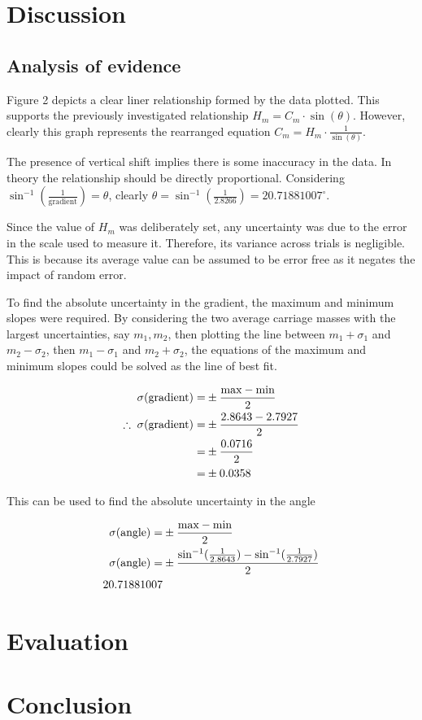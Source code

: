 \documentclass[11pt,a4paper]{article}
\begin{document}
\section{Discussion}
\subsection{Analysis of evidence}
Figure 2 depicts a clear liner relationship formed by the data plotted. This supports the previously investigated relationship  $H_m=C_m\cdot{\sin(\theta)}$. However, clearly this graph represents the rearranged equation $C_m=H_m\cdot \frac{1}{{\sin(\theta)}}$.

The presence of vertical shift implies there is some inaccuracy in the data. In theory the relationship should be directly proportional. Considering
 $\sin^{-1}\left(\frac{1}{\textrm{gradient}}\right)=\theta$, clearly $\theta = \sin^{-1}\left(\frac{1}{2.8266}\right)=20.71881007^\circ$.
 

Since the value of $H_m$ was deliberately set, any uncertainty was due to the error in the scale used to measure it. Therefore, its variance across trials is negligible. This is because its average value can be assumed to be error free as it negates the impact of random error.

To find the absolute uncertainty in the gradient, the maximum and minimum slopes were required. By considering the two average carriage masses with the largest uncertainties, say $m_1, m_2$, then plotting the line between $m_1+\sigma_1$ and $m_2-\sigma_2$, then  $m_1-\sigma_1$ and $m_2+\sigma_2$, the equations of the maximum and minimum slopes could be solved as the line of best fit.


\begin{align*}
	\centering
	\sigma(\textrm{gradient})=&\pm\frac{\textrm{max}-\textrm{min}}{2}\\
	\therefore\;\sigma(\textrm{gradient})=&\pm\frac{2.8643-2.7927}{2}\\
	=&\pm\frac{0.0716}{2}\\
	=&\pm0.0358
\end{align*}

This can be used to find the absolute uncertainty in the angle

\begin{align*}
	\centering
	\sigma(\textrm{angle})=&\pm\frac{\textrm{max}-\textrm{min}}{2}\\
	\sigma(\textrm{angle})=&\pm\frac{\sin^{-1}(\frac{1}{2.8643})-\sin^{-1}(\frac{1}{2.7927})}{2}\\
20.71881007
	\end{align*}

\section{Evaluation}


\section{Conclusion}
\newpage



	
\end{document}
